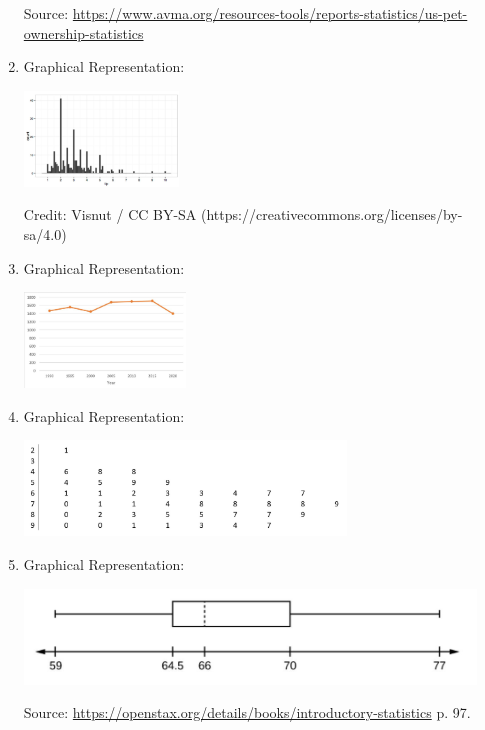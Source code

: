 \documentclass{ximera}
\begin{document}
\begin{problem}
\begin{enumerate}
 Source: \href{https://www.avma.org/resources-tools/reports-statistics/us-pet-ownership-statistics}{https://www.avma.org/resources-tools/reports-statistics/us-pet-ownership-statistics}
 \item Graphical Representation: 
    \begin{image}
   \includegraphics[height=1in]{140H2pic5.jpg}
 \end{image}
 Credit: Visnut / CC BY-SA (https://creativecommons.org/licenses/by-sa/4.0)
 \item Graphical Representation: 
    \begin{image}
   \includegraphics[height=1in]{140H2pic2.jpg}
 \end{image}
 \item Graphical Representation: 
    \begin{image}
   \includegraphics[height=1in]{140H2pic1.jpg}
 \end{image}
 \item Graphical Representation: 
    \begin{image}
   \includegraphics[height=1in]{140H2pic3.jpg}
 \end{image}
 Source: \href{https://openstax.org/details/books/introductory-statistics}{https://openstax.org/details/books/introductory-statistics} p. 97.
\end{enumerate}
\end{problem}
\end{document}
